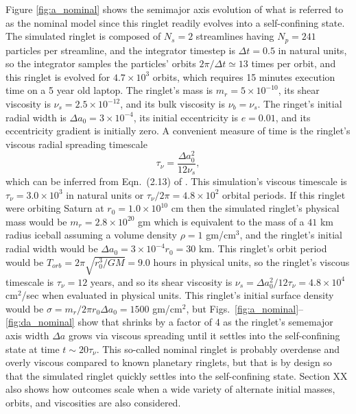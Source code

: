\documentclass[preprint]{aastex62}
\begin{document}
Figure \ref{fig:a_nominal} shows the semimajor axis evolution of what is referred to
as the nominal model since this ringlet readily evolves into a self-confining state.
The simulated ringlet is composed of $N_s=2$ streamlines having $N_p=241$ particles
per streamline, and the integrator timestep is $\Delta t=0.5$ in natural units, so
the integrator samples the particles' orbits $2\pi/\Delta t\simeq13$ times per orbit, and this
ringlet is evolved for $4.7\times10^3$ orbits, which requires 15 minutes execution time
on a 5 year old laptop. The ringlet's mass is
$m_r=5\times10^{-10}$, its shear viscosity is $\nu_s=2.5\times10^{-12}$, and its
bulk viscosity is $\nu_b=\nu_s$. The ringet's initial radial width is
$\Delta a_0 = 3\times10^{-4}$, its initial eccentricity is $e=0.01$, and its
eccentricity gradient is initially zero. A convenient measure of time is the ringlet's
viscous radial spreading timescale
\begin{equation}
\label{eqn:viscous-timesscale}
    \tau_\nu=\frac{\Delta a_0^2}{12\nu_s}, 
\end{equation}
which can be inferred from Eqn.\ (2.13) of \cite{P81}. 
This simulation's viscous timescale is $\tau_\nu=3.0\times10^3$ in natural units
or $\tau_\nu/2\pi=4.8\times10^2$ orbital periods. If this ringlet were orbiting Saturn
at $r_0=1.0\times10^{10}$ cm then the simulated ringlet's physical mass
would be $m_r=2.8\times10^{20}$ gm which is equivalent to the mass of a $41$ km radius iceball assuming
a volume density $\rho=1$ gm/cm$^3$, and the ringlet's initial radial width would be
$\Delta a_0 = 3\times10^{-4}r_0=30$ km. This ringlet's
orbit period would be $T_{orb}=2\pi\sqrt{r_0^3/GM}=9.0$ hours in physical units, so 
the ringlet's viscous timescale is $\tau_\nu=12$ years, and
so its shear viscosity is $\nu_s=\Delta a_0^2/12\tau_\nu = 4.8\times10^4$ cm$^2$/sec
when evaluated in physical units. 
This ringlet's initial surface density would be $\sigma=m_r/2\pi r_0\Delta a_0=1500$ gm/cm$^2$, but
Figs.\ \ref{fig:a_nominal}--\ref{fig:da_nominal} show that shrinks by a factor of 4 as the 
ringlet's sememajor axis width $\Delta a$ grows via viscous spreading until it settles into
the self-confining state at time $t\sim20\tau_\nu$.
This so-called nominal ringlet is probably overdense and overly viscous compared to known 
planetary ringlets,
but that is by design so that the simulated ringlet quickly settles into the self-confining state.
Section XX also shows how outcomes scale when a wide variety of alternate initial masses, orbits,
and viscosities are also considered.
\end{document}
